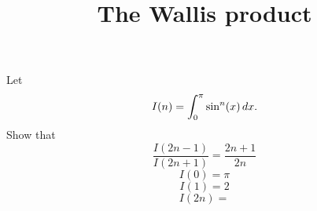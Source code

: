 \documentclass{ximera}
\title[Dig-In:]{The Wallis product}
\begin{document}
\begin{abstract}
\end{abstract}
\maketitle

Let
\[
I(n) = \int_0^\pi \sin^n(x) \,d x.
\]
Show that
\[
\frac{I(2n-1)}{I(2n+1)} = \frac{2n+1}{2n}
\]
\[
I(0) = \pi
\]
\[
I(1) = 2
\]
\[
I(2n) = 
\]
\end{document}
